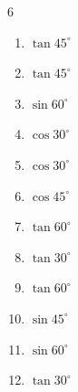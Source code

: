 \begin{multicols}{6}
\begin{enumerate}

  \item $\displaystyle \tan{45^\circ}$

        \phantom{$\displaystyle =1$}

  \item $\displaystyle \tan{45^\circ}$

        \phantom{$\displaystyle =1$}

  \item $\displaystyle \sin{60^\circ}$


  \item $\displaystyle \cos{30^\circ}$


  \item $\displaystyle \cos{30^\circ}$


  \item $\displaystyle \cos{45^\circ}$


  \item $\displaystyle \tan{60^\circ}$


  \item $\displaystyle \tan{30^\circ}$


  \item $\displaystyle \tan{60^\circ}$


\columnbreak %

  \item $\displaystyle \sin{45^\circ}$


  \item $\displaystyle \sin{60^\circ}$


  \item $\displaystyle \tan{30^\circ}$



\end{enumerate}
\end{multicols}
